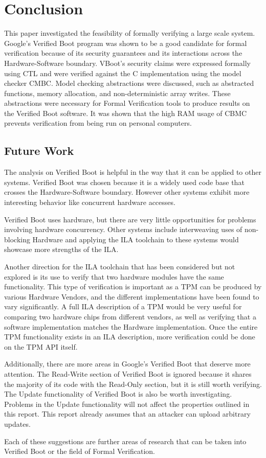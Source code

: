 \chapter{Conclusion}

This paper investigated the feasibility of formally verifying a large scale system.
Google's Verified Boot program was shown to be a good candidate for formal verification because of its security guarantees and its interactions across the Hardware-Software boundary.
VBoot's security claims were expressed formally using CTL and were verified against the C implementation using the model checker CMBC\@. 
Model checking abstractions were discussed, such as abstracted functions, memory
allocation, and non-deterministic array writes.
These abstractions were necessary for Formal Verification tools to produce
results on the Verified Boot software.
It was shown that the high RAM usage of CBMC prevents verification from being run on personal computers.

\section{Future Work}

The analysis on Verified Boot is helpful in the way that it can be applied to
other systems. 
Verified Boot was chosen because it is a widely used code base
that crosses the Hardware-Software boundary. 
However other systems exhibit more interesting behavior like concurrent hardware accesses.

Verified Boot uses hardware, but there are very little opportunities for
problems involving hardware concurrency.
Other systems include interweaving uses of non-blocking
Hardware\cite{load-protocol} and applying the ILA toolchain to these systems would showcase more strengths of the ILA.

Another direction for the ILA toolchain that has been considered but not explored
is its use to verify that two hardware modules have the same functionality.
This type of verification  is important as a TPM can be produced by various Hardware
Vendors\cite{atmel-tpm}\cite{broadcom-tpm}\cite{infineon-tpm}, and the different 
implementations have been found to vary significantly\cite{tcg-inside}.
A full ILA description of a TPM would be very useful for comparing two hardware
chips from different vendors, as well as verifying that a software
implementation matches the Hardware implementation. 
Once the entire TPM functionality exists in an ILA description, more
verification could be done on the TPM API
itself\cite{TPM-state}\cite{TPM-spec-verif}.

Additionally, there are more areas in Google's Verified Boot that
deserve more attention. 
The Read-Write section of Verified Boot is ignored because it shares the
majority of its code with the Read-Only section, but it is still worth verifying. 
The Update functionality of Verified Boot is also be worth investigating.
Problems in the Update functionality will not affect the properties outlined in this report.
This report already assumes that an attacker can upload arbitrary updates.

Each of these suggestions are further areas of research that can be taken into Verified Boot or the field of Formal Verification.
